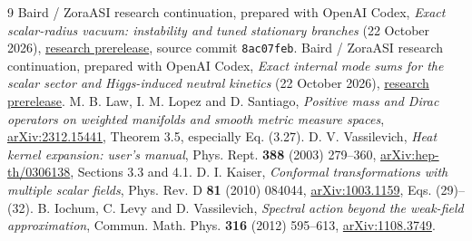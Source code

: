 \begin{thebibliography}{9}\small
{} Baird / ZoraASI research continuation, prepared with OpenAI Codex,
\emph{Exact scalar-radius vacuum: instability and tuned stationary branches} (22 October 2026),
\href{https://github.com/Cbaird26/mqgt-scf-continued/releases/tag/v2026.10.22-exact-coupled-vacuum}{research prerelease}, source commit \texttt{8ac07feb}.
 Baird / ZoraASI research continuation, prepared with OpenAI Codex,
\emph{Exact internal mode sums for the scalar sector and Higgs-induced neutral kinetics} (22 October 2026),
\href{https://github.com/Cbaird26/mqgt-scf-continued/releases/tag/v2026.10.22-exact-scalar-mode-sums}{research prerelease}.
 M. B. Law, I. M. Lopez and D. Santiago,
\emph{Positive mass and Dirac operators on weighted manifolds and smooth metric measure spaces},
\href{https://arxiv.org/abs/2312.15441}{arXiv:2312.15441}, Theorem 3.5, especially Eq. (3.27).
 D. V. Vassilevich, \emph{Heat kernel expansion: user's manual},
Phys. Rept. \textbf{388} (2003) 279--360,
\href{https://arxiv.org/abs/hep-th/0306138}{arXiv:hep-th/0306138}, Sections 3.3 and 4.1.
 D. I. Kaiser, \emph{Conformal transformations with multiple scalar fields},
Phys. Rev. D \textbf{81} (2010) 084044,
\href{https://arxiv.org/abs/1003.1159}{arXiv:1003.1159}, Eqs. (29)--(32).
 B. Iochum, C. Levy and D. Vassilevich,
\emph{Spectral action beyond the weak-field approximation},
Commun. Math. Phys. \textbf{316} (2012) 595--613,
\href{https://arxiv.org/abs/1108.3749}{arXiv:1108.3749}.
\end{thebibliography}
